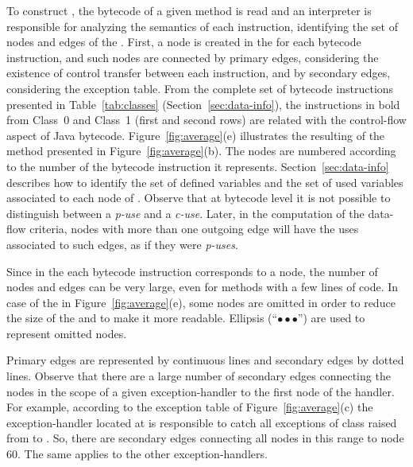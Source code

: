 To construct \IG, the bytecode of a given method is read and an
interpreter is responsible for analyzing the semantics of each
instruction, identifying the set of nodes and edges of the \IG.
First, a node is created in the \IG for each bytecode instruction,
and such nodes are connected by primary edges, considering the
existence of control transfer between each instruction, and by
secondary edges, considering the exception table. From the
complete set of bytecode instructions presented in
Table~\ref{tab:classes} (Section~\ref{sec:data-info}), the
instructions in bold from Class~0 and Class~1 (first and second
rows) are related with the control-flow aspect of Java bytecode.
Figure~\ref{fig:average}(e) illustrates the resulting \IG of the
method presented in Figure~\ref{fig:average}(b). The \IG nodes are
numbered according to the \pc number of the bytecode instruction
it represents. Section~\ref{sec:data-info} describes how to
identify the set  of defined variables and the set
 of used variables associated to each node of \IG.
Observe that at bytecode level it is not possible to distinguish
between a \emph{p-use} and a \emph{c-use}. Later, in the
computation of the data-flow criteria, nodes with more than one
outgoing edge will have the uses associated to such edges, as if
they were \emph{p-uses}.

Since in the \IG each bytecode instruction corresponds to a node,
the number of nodes and edges can be very large, even for methods
with a few lines of code. In case of the \IG in
Figure~\ref{fig:average}(e), some nodes are omitted in order to
reduce the size of the \IG and to make it more readable. Ellipsis
(``$\bullet \bullet \bullet$'') are used to represent omitted
nodes.

Primary edges are represented by continuous lines and secondary
edges by dotted lines. Observe that there are a large number of
secondary edges connecting the nodes in the scope of a given
exception-handler to the first node of the handler. For example,
according to the exception table of Figure~\ref{fig:average}(c)
the exception-handler located at  is responsible to catch
all exceptions of  class raised from  to . So, there are secondary edges connecting all nodes
in this range to node 60. The same applies to the other
exception-handlers.

